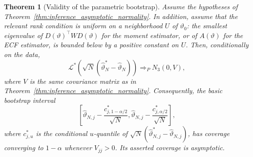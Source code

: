\documentclass[11pt]{amsart}
\numberwithin{equation}{section}\setcounter{tocdepth}{3}\setcounter{secnumdepth}{3}
\newtheorem{theorem}{Theorem}[section]\newtheorem{proposition}[theorem]{Proposition}
\begin{document}
\begin{theorem}[Validity of the parametric bootstrap]\label{thm:parametric_bootstrap}
Assume the hypotheses of Theorem~\ref{thm:inference_asymptotic_normality}.  In addition,
assume that the relevant rank condition is uniform on a neighborhood $U$ of
$\vartheta_0$: the smallest eigenvalue of $D(\vartheta)^\top WD(\vartheta)$ for the
moment estimator, or of $A(\vartheta)$ for the ECF estimator, is bounded below by a
positive constant on $U$.  Then, conditionally on the data,
\begin{equation}
 \mathcal L^*\!\left(
 \sqrt N(\widehat\vartheta_N^*-\widehat\vartheta_N)
 \right)
 \Longrightarrow_P N_3(0,V),
 \label{eq:parametric_bootstrap_validity}
\end{equation}
where $V$ is the same covariance matrix as in
Theorem~\ref{thm:inference_asymptotic_normality}.  Consequently, the basic bootstrap
interval
\begin{equation}
 \left[
 \widehat\vartheta_{N,j}-\frac{c^*_{j,1-\alpha/2}}{\sqrt N},
 \widehat\vartheta_{N,j}-\frac{c^*_{j,\alpha/2}}{\sqrt N}
 \right],
 \label{eq:basic_bootstrap_interval}
\end{equation}
where $c^*_{j,u}$ is the conditional $u$-quantile of
$\sqrt N(\widehat\vartheta_{N,j}^*-\widehat\vartheta_{N,j})$, has coverage converging to
$1-\alpha$ whenever $V_{jj}>0$.  Its asserted coverage is asymptotic.
\end{theorem}
\end{document}
